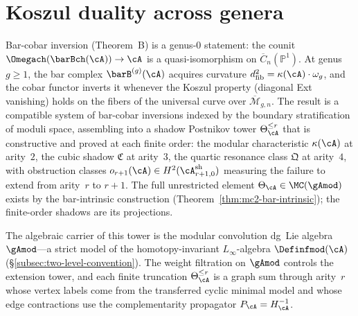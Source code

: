 \section{Koszul duality across genera}\label{sec:koszul-across-genera}\label{app:koszul_higher_genus}

Bar-cobar inversion (Theorem~B) is a genus-$0$ statement: the counit
$\Omegach(\barBch(\cA)) \to \cA$ is a quasi-isomorphism on
$\overline{C}_n(\mathbb{P}^1)$.  At genus~$g \geq 1$, the bar complex
$\barB^{(g)}(\cA)$ acquires curvature
$d_{\mathrm{fib}}^2 = \kappa(\cA) \cdot \omega_g$, and the cobar
functor inverts it whenever the Koszul property (diagonal Ext
vanishing) holds on the fibers of the universal curve over
$\overline{\mathcal{M}}_{g,n}$.  The result is a compatible system of
bar-cobar inversions indexed by the boundary stratification of moduli
space, assembling into a shadow Postnikov tower
$\Theta_\cA^{\leq r}$ that is constructive and proved at each finite
order: the modular characteristic $\kappa(\cA)$ at arity~$2$, the
cubic shadow $\mathfrak{C}$ at arity~$3$, the quartic resonance class
$\mathfrak{Q}$ at arity~$4$, with obstruction classes
$o_{r+1}(\cA) \in H^2(\cA^{\mathrm{sh}}_{r+1,0})$ measuring the
failure to extend from arity~$r$ to $r{+}1$.  The full unrestricted
element $\Theta_\cA \in \MC(\gAmod)$ exists by the bar-intrinsic
construction (Theorem~\ref{thm:mc2-bar-intrinsic}); the finite-order
shadows are its projections.

The algebraic carrier of this tower is the modular convolution dg~Lie
algebra~$\gAmod$---a strict model of the homotopy-invariant
$L_\infty$-algebra $\Definfmod(\cA)$
(\S\ref{subsec:two-level-convention}).  The weight filtration on
$\gAmod$ controls the extension tower, and each finite truncation
$\Theta_\cA^{\leq r}$ is a graph sum through arity~$r$ whose vertex
labels come from the transferred cyclic minimal model and whose edge
contractions use the complementarity propagator
$P_\cA = H_\cA^{-1}$.

